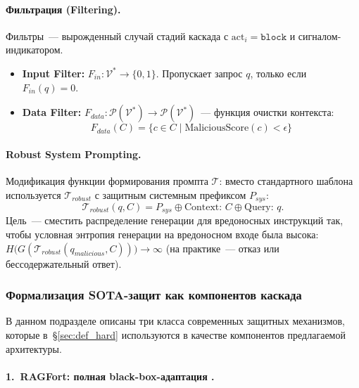\documentclass[12pt, a4paper]{article}
\theoremstyle{definition}
\theoremstyle{remark}
\begin{document}
\paragraph{Фильтрация (Filtering).}
Фильтры~--- вырожденный случай стадий каскада с $\text{act}_i = \texttt{block}$ и сигналом-индикатором.
\begin{itemize}
    \item \textbf{Input Filter:} $F_{in}: \mathcal{V}^* \to \{0, 1\}$. Пропускает запрос $q$, только если $F_{in}(q) = 0$.
    \item \textbf{Data Filter:} $F_{data}: \mathcal{P}(\mathcal{V}^*) \to \mathcal{P}(\mathcal{V}^*)$~--- функция очистки контекста:
    \begin{equation}
        F_{data}(C) = \{ c \in C \mid \text{MaliciousScore}(c) < \epsilon \}
    \end{equation}
\end{itemize}

\paragraph{Robust System Prompting.}
Модификация функции формирования промпта $\mathcal{T}$: вместо стандартного шаблона используется $\mathcal{T}_{robust}$ с защитным системным префиксом $P_{sys}$:
\begin{equation}
    \mathcal{T}_{robust}(q, C) = P_{sys} \oplus \text{Context: } C \oplus \text{Query: } q.
\end{equation}
Цель~--- сместить распределение генерации для вредоносных инструкций так, чтобы условная энтропия генерации на вредоносном входе была высока: $H\bigl(G(\mathcal{T}_{robust}(q_{malicious}, C))\bigr) \to \infty$ (на практике~--- отказ или бессодержательный ответ).

\subsubsection{Формализация SOTA-защит как компонентов каскада}
\label{sec:def_sota}

В данном подразделе описаны три класса современных защитных механизмов, которые в~\S\ref{sec:def_hard} используются в качестве компонентов предлагаемой архитектуры.

\paragraph{1.~RAGFort: полная black-box-адаптация \cite{RAGFort2025}.}
\end{document}
